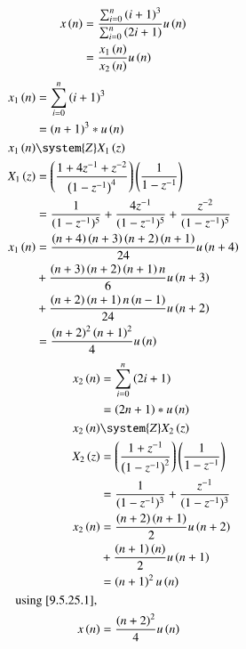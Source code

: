 \documentclass[journal,12pt,twocolumn]{article}
\begin{document}
\begin{align}
    x\left(n\right) & = \frac{\sum_{i=0}^{n} \left(i+1\right)^{3}}{\sum_{i=0}^{n} \left(2i+1\right)} u\left(n\right)  \\
    & = \frac{x_1\left(n\right)}{x_2\left(n\right)}u\left(n\right) \label{eq: 9.5.25.1}
\end{align}
\begin{align}
    x_1\brak{n} & = \sum_{i=0}^{n} \brak{i+1}^{3}\\
    & = \brak{n+1}^{3} * u\brak{n}\\
    x_1\brak{n} & \system{Z} X_1\brak{z}\\
    X_1\brak{z} & = \brak{\frac{1 + 4z^{-1} + z^{-2}}{\brak{1-z^{-1}}^4}} \brak{\frac{1}{1-z^{-1}}}\\
    & = \frac{1}{(1 - z^{-1})^5} + \frac{4 z^{-1}}{(1 - z^{-1})^5} + \frac{z^{-2}}{(1 - z^{-1})^5}\\
    x_1\brak{n} & = \frac{\brak{n + 4} \brak{n + 3} \brak{n + 2} \brak{n + 1}}{24}u\brak{n+4}\\
    & + \frac{\brak{n + 3} \brak{n + 2} \brak{n + 1} n}{6}u\brak{n+3}\notag\\
    & + \frac{\brak{n + 2} \brak{n + 1} n \brak{n - 1}}{24}u\brak{n+2}\notag\\
    & = \frac{\brak{n+2}^2\brak{n+1}^2}{4}u\brak{n}
\end{align}
\begin{align}
    x_2\brak{n} & = \sum_{i=0}^{n} \brak{2i+1}\\
    & = \brak{2n+1} * u\brak{n}\\
    x_2\brak{n} & \system{Z} X_2\brak{z}\\
    X_2\brak{z} & = \brak{\frac{1 + z^{-1}}{\brak{1-z^{-1}}^2}} \brak{\frac{1}{1-z^{-1}}}\\
    & = \frac{1}{(1 - z^{-1})^3} + \frac{z^{-1}}{(1 - z^{-1})^3}\\
    x_2\brak{n} & = \frac{\brak{n + 2} \brak{n + 1}}{2}u\brak{n+2}\\
    & + \frac{\brak{n + 1} \brak{n} }{2}u\brak{n+1}\notag\\
    & = \brak{n+1}^2u\brak{n}\\
    \notag \text{using \eqref{9.5.25.1}, } \\
    x\brak{n} & = \frac{\brak{n+2}^2}{4} u\brak{n}\label{eq: 9.5.25.2}
\end{align}
\end{document}

